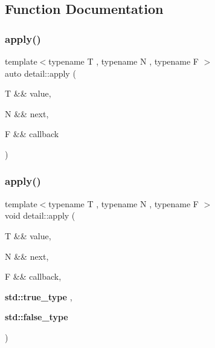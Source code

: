 \subsection{Function Documentation}
\mbox{\label{namespacedetail_a910933a8b2f5acce683775f956e97d48}} 
\subsubsection{\texorpdfstring{apply()}{apply()}\hspace{0.1cm}{\footnotesize\ttfamily [1/4]}}
{\footnotesize\ttfamily template$<$typename T , typename N , typename F $>$ \\
auto detail\+::apply (\begin{DoxyParamCaption}\item[{T \&\&}]{value,  }\item[{N \&\&}]{next,  }\item[{F \&\&}]{callback }\end{DoxyParamCaption})}

\mbox{\label{namespacedetail_a3711fd6b77c0779d28e5a3608f1a8e51}} 
\subsubsection{\texorpdfstring{apply()}{apply()}\hspace{0.1cm}{\footnotesize\ttfamily [2/4]}}
{\footnotesize\ttfamily template$<$typename T , typename N , typename F $>$ \\
void detail\+::apply (\begin{DoxyParamCaption}\item[{T \&\&}]{value,  }\item[{N \&\&}]{next,  }\item[{F \&\&}]{callback,  }\item[{\textbf{ std\+::true\+\_\+type}}]{,  }\item[{\textbf{ std\+::false\+\_\+type}}]{ }\end{DoxyParamCaption})}

\mbox{\label{namespacedetail_acbe3cd2b577d9cb1e2e9383021c208d4}} 
